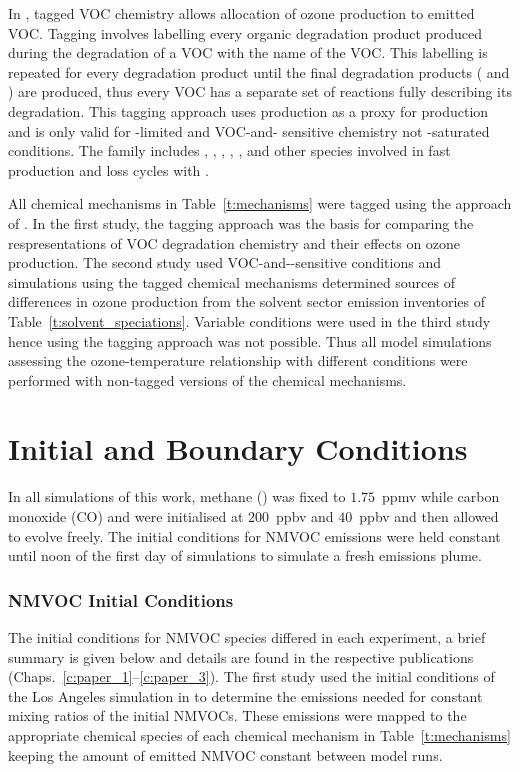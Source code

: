 In \citet{Butler:2011}, tagged VOC chemistry allows allocation of ozone production to emitted VOC.
Tagging involves labelling every organic degradation product produced during the degradation of a VOC with the name of the VOC.
This labelling is repeated for every degradation product until the final degradation products ( and ) are produced, thus every VOC has a separate set of reactions fully describing its degradation.
This tagging approach uses  production as a proxy for  production and is only valid for -limited and VOC-and- sensitive chemistry not -saturated conditions.
The  family includes , , , , ,  and other species involved in fast production and loss cycles with .

\newpage
All chemical mechanisms in Table~\ref{t:mechanisms} were tagged using the approach of \citet{Butler:2011}.
In the first study, the tagging approach was the basis for comparing the respresentations of VOC degradation chemistry and their effects on ozone production.
The second study used VOC-and--sensitive conditions and simulations using the tagged chemical mechanisms determined sources of differences in ozone production from the solvent sector emission inventories of Table~\ref{t:solvent_speciations}.
Variable  conditions were used in the third study hence using the tagging approach was not possible.
Thus all model simulations assessing the ozone-temperature relationship with different  conditions were performed with non-tagged versions of the chemical mechanisms.

\section{Initial and Boundary Conditions} \label{s:initial_conditions}
In all simulations of this work, methane () was fixed to $1.75$~ppmv while carbon monoxide (CO) and  were initialised at $200$~ppbv and $40$~ppbv and then allowed to evolve freely.
The initial conditions for NMVOC emissions were held constant until noon of the first day of simulations to simulate a fresh emissions plume.

\subsubsection{NMVOC Initial Conditions} 
The initial conditions for NMVOC species differed in each experiment, a brief summary is given below and details are found in the respective publications (Chaps.~\ref{c:paper_1}--\ref{c:paper_3}).
The first study used the initial conditions of the Los Angeles simulation in \citet{Butler:2011} to determine the emissions needed for constant mixing ratios of the initial NMVOCs.
These emissions were mapped to the appropriate chemical species of each chemical mechanism in Table~\ref{t:mechanisms} keeping the amount of emitted NMVOC constant between model runs.

